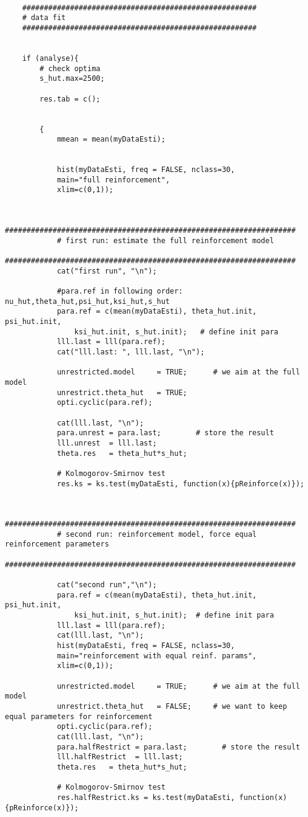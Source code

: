 \begin{lstlisting}
	
	######################################################
	# data fit
	######################################################
	
	
	if (analyse){
		# check optima
		s_hut.max=2500;
		
		res.tab = c();
		
		
		{
			mmean = mean(myDataEsti);
			
			
			hist(myDataEsti, freq = FALSE, nclass=30, 
			main="full reinforcement",
			xlim=c(0,1));
			
			
			###################################################################
			# first run: estimate the full reinforcement model
			###################################################################
			cat("first run", "\n");
			
			#para.ref in following order: nu_hut,theta_hut,psi_hut,ksi_hut,s_hut
			para.ref = c(mean(myDataEsti), theta_hut.init, psi_hut.init,
				ksi_hut.init, s_hut.init);   # define init para
			lll.last = lll(para.ref);
			cat("lll.last: ", lll.last, "\n");
			
			unrestricted.model     = TRUE;      # we aim at the full model
			unrestrict.theta_hut   = TRUE;
			opti.cyclic(para.ref);
			
			cat(lll.last, "\n");
			para.unrest = para.last;        # store the result
			lll.unrest  = lll.last;
			theta.res   = theta_hut*s_hut;
			
			# Kolmogorov-Smirnov test
			res.ks = ks.test(myDataEsti, function(x){pReinforce(x)}); 
			
			
			###################################################################
			# second run: reinforcement model, force equal reinforcement parameters 
			###################################################################
			
			cat("second run","\n");
			para.ref = c(mean(myDataEsti), theta_hut.init, psi_hut.init,
				ksi_hut.init, s_hut.init);  # define init para
			lll.last = lll(para.ref);
			cat(lll.last, "\n");
			hist(myDataEsti, freq = FALSE, nclass=30, 
			main="reinforcement with equal reinf. params",
			xlim=c(0,1));
			
			unrestricted.model     = TRUE;      # we aim at the full model
			unrestrict.theta_hut   = FALSE;     # we want to keep equal parameters for reinforcement
			opti.cyclic(para.ref);
			cat(lll.last, "\n");
			para.halfRestrict = para.last;        # store the result
			lll.halfRestrict  = lll.last;
			theta.res   = theta_hut*s_hut;
			
			# Kolmogorov-Smirnov test
			res.halfRestrict.ks = ks.test(myDataEsti, function(x){pReinforce(x)}); 
			

\end{lstlisting}
